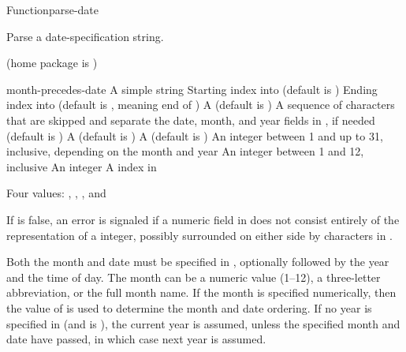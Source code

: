 \documentclass[10pt,twoside,english,pdftex]{article}
\begin{document}
\begin{functiondoc}{Function}{parse-date}{%
     
    }
% 

\fnsyntax

\fnpurpose Parse a date-specification string.

\fnpackage {} (home package is )

\fnmodule {}

\fnargs
\begin{args}{month-precedes-date}
\arg[string] A simple string
\arg[start] Starting index into  (default is )
\arg[end] Ending index into  (default is \nil, meaning
end of )
 A  (default is \nil)
\arg[separators] A sequence of characters that are skipped and separate the
 date, month, and year fields in , if needed (default is 
 )
 A  (default is 
)
 A  (default is \nil)
\arg[date] An integer between 1 and up to 31, inclusive, depending
  on the month and year
\arg[month] An integer between 1 and 12, inclusive
\arg[year] An integer
\arg[position] A index in 
\end{args}

\fnreturns Four values: , , , and

\fnerrors
%
If  is false, an error is signaled if a numeric field in
 does not consist entirely of the representation of a integer,
possibly surrounded on either side by characters in .

\fndescription
%
Both the month and date must be specified in , optionally followed
by the year and the time of day. The month can be a numeric value (1--12), a
three-letter abbreviation, or the full month name.  If the month is specified
numerically, then the value of  is used to
determine the month and date ordering. If no year is specified in 
(and  is \nil), the current year is assumed, unless the
specified month and date have passed, in which case next year is assumed. 


\end{functiondoc}
\end{document}
